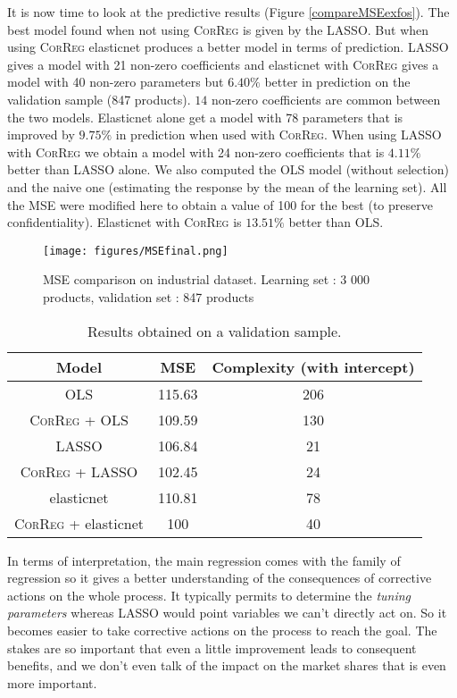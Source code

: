 \documentclass[11pt,a4paper]{article}
\begin{document}
			It is now time to look at the predictive results (Figure \ref{compareMSEexfos}).
				The best model found when not using \textsc{CorReg} is given by the LASSO. But when using \textsc{CorReg} elasticnet produces a better model in terms of prediction. LASSO gives a model with 21 non-zero coefficients and elasticnet with \textsc{CorReg} gives a model with 40 non-zero parameters but $6.40\%$ better in prediction on the validation sample (847 products). $14$ non-zero coefficients are common between the two models.
				Elasticnet alone get a model with 78 parameters that is improved by $9.75\%$ in prediction when used with \textsc{CorReg}. When using LASSO with \textsc{CorReg} we obtain a model with 24 non-zero coefficients that is $4.11\%$ better than LASSO alone. We also computed the OLS model (without selection) and the naive one (estimating the response by the mean of the learning set). All the MSE were modified here to obtain a value of 100 for the best (to preserve confidentiality). Elasticnet with \textsc{CorReg} is $13.51\%$ better than OLS.
		\begin{figure}[h]
			\centering
				\label{barplotMSEexfos}
				\texttt{[image: figures/MSEfinal.png]}
			\caption{MSE comparison on industrial dataset. Learning set : 3 000 products, validation set : 847 products}
		\end{figure}		
		\begin{table}[h!]
\centering
\begin{tabular}{|c|c|c|}
	\hline 
	Model & MSE & Complexity (with intercept) \\ 
	\hline 
	OLS & 115.63 & 206 \\ 
	\hline 
	\textsc{CorReg} + OLS & 109.59&130 \\ 
	\hline  
	LASSO & 106.84 & 21 \\ 
	\hline 
	\textsc{CorReg} + LASSO & 102.45 &24 \\ 
	\hline 
	elasticnet & 110.81 & 78\\ 
	\hline 
	\textsc{CorReg} + elasticnet & 100 &40 \\ 
	\hline 
\end{tabular} 
\caption{Results obtained on a validation sample.}	
\end{table}

		In terms of interpretation, the main regression comes with the family of regression so it gives a better understanding of the consequences of corrective actions on the whole process. It typically permits to determine the \textit{tuning parameters} whereas LASSO would point variables we can't directly act on.	So it becomes easier to take corrective actions on the process to reach the goal. The stakes are so important that even a little improvement leads to consequent benefits, and we don't even talk of the impact on the market shares that is even more important.
		\clearpage
		
\end{document}
